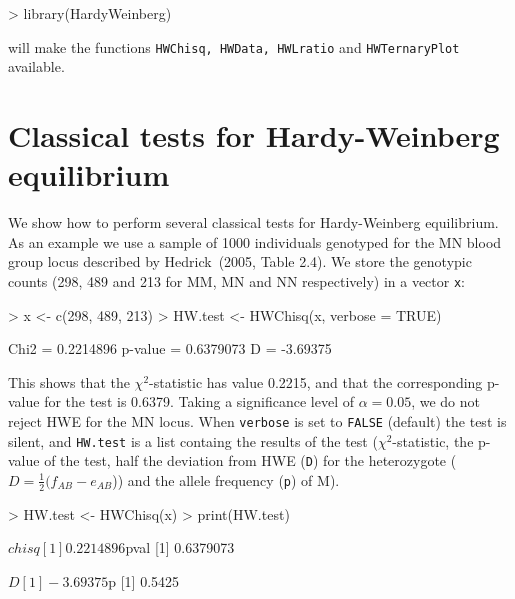 \documentclass[a4paper]{article}
\begin{document}
\begin{Schunk}
\begin{Sinput}
> library(HardyWeinberg)
\end{Sinput}
\end{Schunk}

will make the functions {\tt HWChisq, HWData, HWLratio} and {\tt HWTernaryPlot} available. 

\section{Classical tests for Hardy-Weinberg equilibrium}
\label{sec:classical}

We show how to perform several classical tests for Hardy-Weinberg equilibrium. As an example we
use a sample of 1000 individuals genotyped for the MN blood group locus described by
Hedrick~(2005, Table 2.4). We store the genotypic counts (298, 489 and 213 for MM, MN and NN
respectively) in a vector {\tt x}:

\begin{Schunk}
\begin{Sinput}
> x <- c(298, 489, 213)
> HW.test <- HWChisq(x, verbose = TRUE)
\end{Sinput}
\begin{Soutput}
Chi2 =  0.2214896 p-value =  0.6379073 D =  -3.69375 
\end{Soutput}
\end{Schunk}

This shows that the $\chi^2$-statistic has value 0.2215, and that the corresponding p-value for 
the test is 0.6379. Taking a significance level of $\alpha = 0.05$, we do not reject HWE for
the MN locus. When {\tt verbose} is set to {\tt FALSE} (default) the test is silent, and {\tt HW.test}
is a list containg the results of the test ($\chi^2$-statistic, the p-value of the test, half the deviation from 
HWE ({\tt D}) for the heterozygote ($D = \frac{1}{2} (f_{AB} - e_{AB}$)) 
and the allele frequency ({\tt p}) of M).

\begin{Schunk}
\begin{Sinput}
> HW.test <- HWChisq(x)
> print(HW.test)
\end{Sinput}
\begin{Soutput}
$chisq
[1] 0.2214896

$pval
[1] 0.6379073

$D
[1] -3.69375

$p
[1] 0.5425
\end{Soutput}
\end{Schunk}
\end{document}
